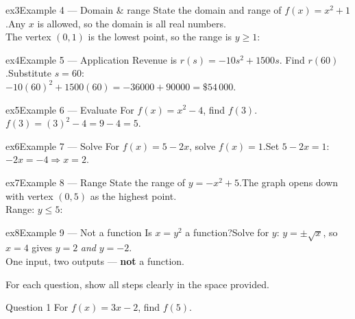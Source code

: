 \documentclass[11pt]{article}
\begin{document}
\begin{example}{ex3}{Example 4 --- Domain \& range}
State the domain and range of $f(x)=x^2+1$.\soln Any $x$ is allowed, so the domain is all real numbers. \\ The vertex $(0,1)$ is the lowest point, so the range is $y\ge1$:
\end{example}

\begin{example}{ex4}{Example 5 --- Application}
Revenue is $r(s)=-10s^2+1500s$. Find $r(60)$.\soln Substitute $s=60$: \\ $-10(60)^2+1500(60)=-36000+90000=\$54\,000$.
\end{example}

\begin{example}{ex5}{Example 6 --- Evaluate}
For $f(x)=x^2-4$, find $f(3)$.\soln $f(3)=(3)^2-4=9-4=5$.
\end{example}

\begin{example}{ex6}{Example 7 --- Solve}
For $f(x)=5-2x$, solve $f(x)=1$.\soln Set $5-2x=1$: \\ $-2x=-4\Rightarrow x=2$.
\end{example}

\begin{example}{ex7}{Example 8 --- Range}
State the range of $y=-x^2+5$.\soln The graph opens down with vertex $(0,5)$ as the highest point. \\ Range: $y\le5$:
\end{example}

\begin{example}{ex8}{Example 9 --- Not a function}
Is $x=y^2$ a function?\soln Solve for $y$: $y=\pm\sqrt{x}$, so $x=4$ gives $y=2$ \emph{and} $y=-2$. \\ One input, two outputs — \textbf{not} a function.
\end{example}

\clearpage
{}
For each question, show all steps clearly in the space provided.

\begin{qbox}{Question 1}
For $f(x)=3x-2$, find $f(5)$.\workspace{2.4cm}
\end{qbox}
\end{document}
